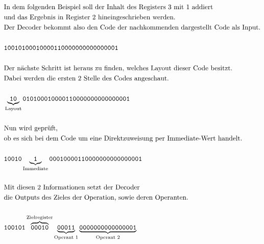 \documentclass[paper=a4,fontsize=12pt,twocolumn]{scrreprt}
\begin{document}
\begin{figure*}[h]
    \centering
    \begin{align*}
        &\text{In dem folgenden Beispiel soll der Inhalt des Registers 3 mit 1 addiert}\\
        &\text{und das Ergebnis in Register 2 hineingeschrieben werden.}\\
        &\text{Der Decoder bekommt also den Code der nachkommenden dargestellt Code als Input.}\\
        &\text{\newline}\\
        &\texttt{10010100010000110000000000000001}\\
        &\text{\newline}\\
        &\text{Der nächste Schritt ist heraus zu finden, welches Layout dieser Code besitzt.}\\
        &\text{Dabei werden die ersten 2 Stelle des Codes angeschaut.}\\
        &\text{\newline}\\
        &\underbrace{\texttt{10}}_\text{Layout}\texttt{010100010000110000000000000001}\\
        &\text{\newline}\\
        &\text{Nun wird geprüft,}\\
        &\text{ob es sich bei dem Code um eine Direktzuweisung per Immediate-Wert handelt.}\\
        &\text{\newline}\\
        &\texttt{10010}\underbrace{\texttt{1}}_\text{Immediate}\texttt{00010000110000000000000001}\\
        &\text{\newline}\\
        &\text{Mit diesen 2 Informationen setzt der Decoder}\\
        &\text{die Outputs des Zieles der Operation, sowie deren Operanten.}\\
        &\text{\newline}\\
        &\texttt{100101}
            \overbrace{\texttt{00010}}^\text{Zielregister}
            \underbrace{\texttt{00011}}_\text{Operant 1}
            \underbrace{\texttt{0000000000000001}}_\text{Operant 2}\\
        &\text{\newline}\\   

\end{align*}
\end{figure*}
\end{document}

